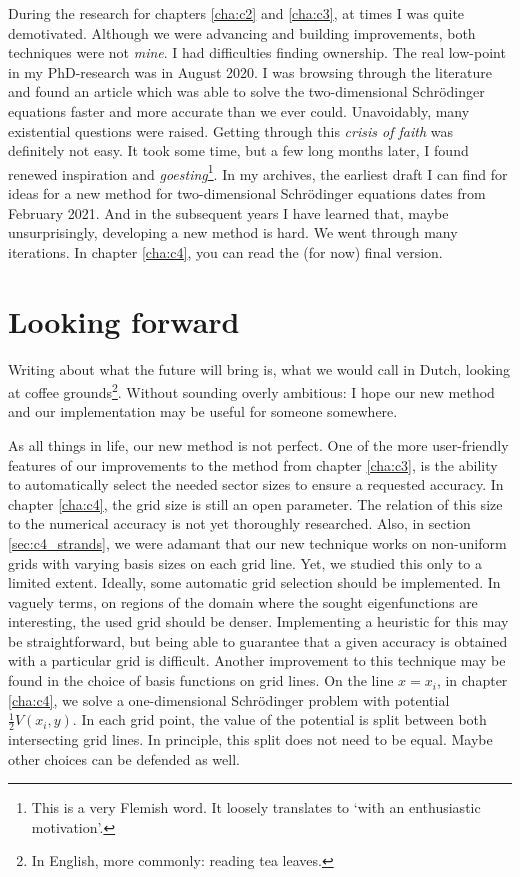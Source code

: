 During the research for chapters \ref{cha:c2} and \ref{cha:c3}, at times I was quite demotivated. Although we were advancing and building improvements, both techniques were not \emph{mine}. I had difficulties finding ownership. The real low-point in my PhD-research was in August 2020. I was browsing through the literature and found an article which was able to solve the two-dimensional Schrödinger equations faster and more accurate than we ever could. Unavoidably, many existential questions were raised. Getting through this \emph{crisis of faith} was definitely not easy. It took some time, but a few long months later, I found renewed inspiration and \emph{goesting}\footnote{This is a very Flemish word. It loosely translates to `with an enthusiastic motivation'.}. In my archives, the earliest draft I can find for ideas for a new method for two-dimensional Schrödinger equations dates from February 2021. And in the subsequent years I have learned that, maybe unsurprisingly, developing a new method is hard. We went through many iterations. In chapter \ref{cha:c4}, you can read the (for now) final version.


\section*{Looking forward}

Writing about what the future will bring is, what we would call in Dutch, looking at coffee grounds\footnote{In English, more commonly: reading tea leaves.}. Without sounding overly ambitious: I hope our new method and our implementation may be useful for someone somewhere.

As all things in life, our new method is not perfect. One of the more user-friendly features of our improvements to the method from chapter \ref{cha:c3}, is the ability to automatically select the needed sector sizes to ensure a requested accuracy. In chapter \ref{cha:c4}, the grid size is still an open parameter. The relation of this size to the numerical accuracy is not yet thoroughly researched. Also, in section \ref{sec:c4_strands}, we were adamant that our new technique works on non-uniform grids with varying basis sizes on each grid line. Yet, we studied this only to a limited extent. Ideally, some automatic  grid selection should be implemented. In vaguely terms, on regions of the domain where the sought eigenfunctions are interesting, the used grid should be denser. Implementing a heuristic for this may be straightforward, but being able to guarantee that a given accuracy is obtained with a particular grid is difficult. Another improvement to this technique may be found in the choice of basis functions on grid lines. On the line $x = x_i$, in chapter \ref{cha:c4}, we solve a one-dimensional Schrödinger problem with potential $\frac{1}{2} V(x_i, y)$. In each grid point, the value of the potential is split between both intersecting grid lines. In principle, this split does not need to be equal. Maybe other choices can be defended as well.

